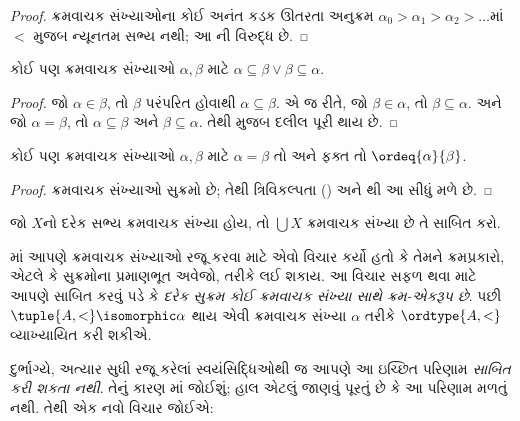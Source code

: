 \begin{proof}
ક્રમવાચક સંખ્યાઓના કોઈ અનંત કડક
ઊતરતા અનુક્રમ
$\alpha_0 > \alpha_1 > \alpha_2 > \ldots$માં
$<$ મુજબ ન્યૂનતમ સભ્ય નથી;
આ ની
વિરુદ્ધ છે.
\end{proof}

\begin{prop}
કોઈ પણ ક્રમવાચક સંખ્યાઓ
$\alpha, \beta$ માટે
$\alpha \subseteq \beta \lor \beta \subseteq \alpha$.
\end{prop}

\begin{proof}
જો $\alpha \in \beta$, તો $\beta$
પરંપરિત હોવાથી $\alpha \subseteq \beta$.
એ જ રીતે, જો $\beta \in \alpha$,
તો $\beta \subseteq
\alpha$. અને જો $\alpha = \beta$,
તો $\alpha \subseteq \beta$ અને
$\beta \subseteq \alpha$.
તેથી  મુજબ
દલીલ પૂરી થાય છે.
\end{proof}

\begin{prop}
કોઈ પણ ક્રમવાચક સંખ્યાઓ
$\alpha, \beta$ માટે
$\alpha = \beta$ તો અને ફક્ત તો
$\ordeq{\alpha}{\beta}$.
\end{prop}

\begin{proof}
ક્રમવાચક સંખ્યાઓ સુક્રમો છે;
તેથી ત્રિવિકલ્પતા
() અને
થી
આ સીધું મળે છે.
\end{proof}

\begin{prob}
જો $X$નો દરેક સભ્ય ક્રમવાચક
સંખ્યા હોય, તો $\bigcup X$
ક્રમવાચક સંખ્યા છે તે સાબિત કરો.
\end{prob}
\endgroup

\begingroup
\makeatletter{}\makeatother

\label{guunit:OLP-0554}


માં આપણે ક્રમવાચક સંખ્યાઓ રજૂ કરવા માટે
એવો વિચાર કર્યો હતો કે તેમને ક્રમપ્રકારો, એટલે કે સુક્રમોના પ્રમાણભૂત
અવેજો, તરીકે લઈ શકાય. આ વિચાર સફળ થવા માટે આપણે સાબિત કરવું પડે કે
\emph{દરેક સુક્રમ કોઈ ક્રમવાચક સંખ્યા સાથે ક્રમ-એકરૂપ છે}.
પછી $\tuple{A, <} \isomorphic \alpha$ થાય એવી ક્રમવાચક
સંખ્યા $\alpha$ તરીકે $\ordtype{A, <}$ વ્યાખ્યાયિત કરી શકીએ.

દુર્ભાગ્યે, અત્યાર સુધી રજૂ કરેલાં સ્વયંસિદ્ધિઓથી જ આપણે આ ઇચ્છિત
પરિણામ \emph{સાબિત કરી શકતા નથી}. તેનું કારણ
માં જોઈશું; હાલ એટલું જાણવું
પૂરતું છે કે આ પરિણામ મળતું નથી. તેથી એક નવો વિચાર જોઈએ:

